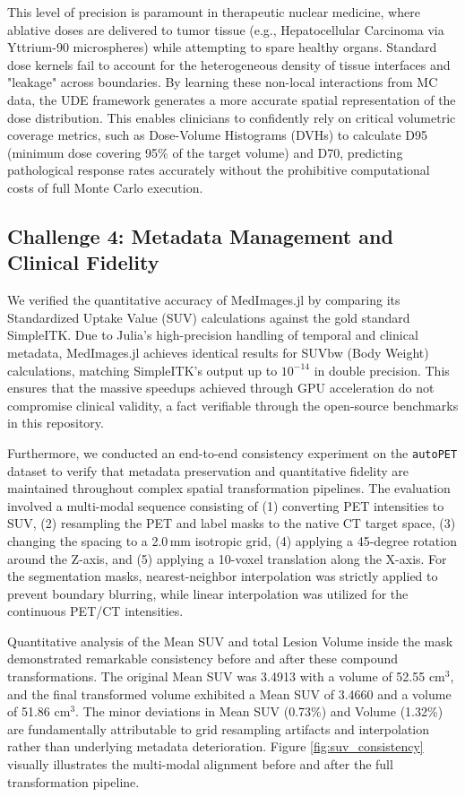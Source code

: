 \documentclass[10pt,letterpaper]{article}
\begin{document}
This level of precision is paramount in therapeutic nuclear medicine, where ablative doses are delivered to tumor tissue (e.g., Hepatocellular Carcinoma via Yttrium-90 microspheres) while attempting to spare healthy organs. Standard dose kernels fail to account for the heterogeneous density of tissue interfaces and "leakage" across boundaries. By learning these non-local interactions from MC data, the UDE framework generates a more accurate spatial representation of the dose distribution. This enables clinicians to confidently rely on critical volumetric coverage metrics, such as Dose-Volume Histograms (DVHs) to calculate D95 (minimum dose covering 95\% of the target volume) and D70, predicting pathological response rates accurately without the prohibitive computational costs of full Monte Carlo execution.

\subsection*{Challenge 4: Metadata Management and Clinical Fidelity}
We verified the quantitative accuracy of MedImages.jl by comparing its Standardized Uptake Value (SUV) calculations against the gold standard SimpleITK. Due to Julia's high-precision handling of temporal and clinical metadata, MedImages.jl achieves identical results for SUVbw (Body Weight) calculations, matching SimpleITK's output up to $10^{-14}$ in double precision. This ensures that the massive speedups achieved through GPU acceleration do not compromise clinical validity, a fact verifiable through the open-source benchmarks in this repository.

Furthermore, we conducted an end-to-end consistency experiment on the \texttt{autoPET} dataset \cite{Dexl_2025} to verify that metadata preservation and quantitative fidelity are maintained throughout complex spatial transformation pipelines. The evaluation involved a multi-modal sequence consisting of (1) converting PET intensities to SUV, (2) resampling the PET and label masks to the native CT target space, (3) changing the spacing to a 2.0\,mm isotropic grid, (4) applying a 45-degree rotation around the Z-axis, and (5) applying a 10-voxel translation along the X-axis. For the segmentation masks, nearest-neighbor interpolation was strictly applied to prevent boundary blurring, while linear interpolation was utilized for the continuous PET/CT intensities.

Quantitative analysis of the Mean SUV and total Lesion Volume inside the mask demonstrated remarkable consistency before and after these compound transformations. The original Mean SUV was 3.4913 with a volume of 52.55 $\text{cm}^3$, and the final transformed volume exhibited a Mean SUV of 3.4660 and a volume of 51.86 $\text{cm}^3$. The minor deviations in Mean SUV (0.73\%) and Volume (1.32\%) are fundamentally attributable to grid resampling artifacts and interpolation rather than underlying metadata deterioration. Figure \ref{fig:suv_consistency} visually illustrates the multi-modal alignment before and after the full transformation pipeline.
\end{document}
